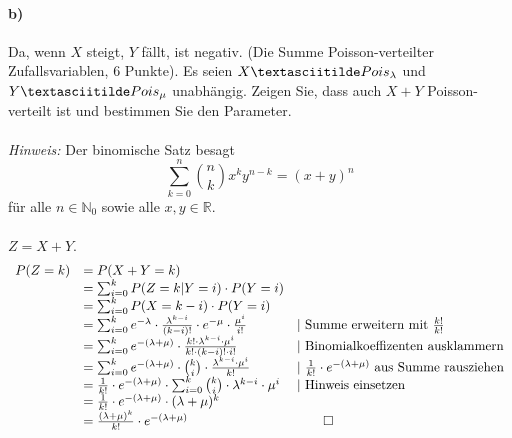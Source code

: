 \documentclass[twoside]{article}
\begin{document}
\paragraph{b)}Da, wenn $X$ steigt, $Y$ fällt, ist  negativ.
(Die Summe Poisson-verteilter Zufallsvariablen, 6 Punkte).
Es seien $X \textasciitilde Pois_{\lambda}$ und $Y \textasciitilde Pois_{\mu}$ unabhängig.
Zeigen Sie, dass auch $X+Y$ Poisson-verteilt ist und bestimmen Sie den Parameter.\\
\\
\textit{Hinweis:} Der binomische Satz besagt
\[
	\sum_{k=0}^{n}\binom{n}{k}x^ky^{n-k}=(x+y)^n
\]
für alle $n \in \mathbb{N}_0$ sowie alle $x,y \in \mathbb{R}$.\\
\vspace{.3cm}\\
$Z = X + Y$.\\
\[\begin{array}{lll}
	P(Z=k)	&=	P(X+Y=k)																										\\
			&=	\sum_{i=0}^{k}P(Z=k|Y=i) \cdot P(Y=i)																			\\
			&=	\sum_{i=0}^{k}P(X=k-i) \cdot P(Y=i)																			\\
			&=	\sum_{i=0}^{k}e^{-\lambda} \cdot \frac{\lambda^{k-i}}{(k-i)!} \cdot e^{-\mu} \cdot \frac{\mu^i}{i!}			&|~\text{Summe erweitern mit }\frac{k!}{k!}\\
			&=	\sum_{i=0}^{k}e^{-(\lambda+\mu)} \cdot \frac{k! \cdot \lambda^{k-i} \cdot \mu^i}{k! \cdot (k-i)! \cdot i!}	&|~\text{Binomialkoeffizenten ausklammern}\\
			&=	\sum_{i=0}^{k}e^{-(\lambda+\mu)} \cdot \binom{k}{i} \cdot \frac{\lambda^{k-i}\cdot\mu^i}{k!}					&|~\frac{1}{k!}\cdot e^{-(\lambda+\mu)}\text{ aus Summe rausziehen}\\
			&=	\frac{1}{k!} \cdot e^{-(\lambda+\mu)} \cdot \sum_{i=0}^{k} \binom{k}{i} \cdot \lambda^{k-i}\cdot\mu^i		&|~\text{Hinweis einsetzen}\\
			&=	\frac{1}{k!} \cdot e^{-(\lambda+\mu)} \cdot (\lambda+\mu)^k													\\
			&=	\frac{(\lambda+\mu)^k}{k!} \cdot e^{-(\lambda+\mu)}															&\qed
\end{array}\]
\end{document}
